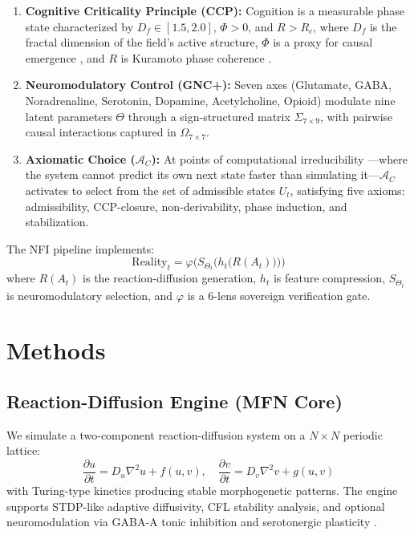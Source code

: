 \documentclass[10pt,letterpaper]{article}
\begin{document}
\begin{enumerate}
  \item \textbf{Cognitive Criticality Principle (CCP):} Cognition is a
    measurable phase state characterized by $D_f \in [1.5, 2.0]$,
    $\Phi > 0$, and $R > R_c$, where $D_f$ is the fractal dimension
    of the field's active structure, $\Phi$ is a proxy for causal
    emergence \citep{hoel2013}, and $R$ is Kuramoto phase
    coherence \citep{kuramoto1984}.

  \item \textbf{Neuromodulatory Control (GNC+):} Seven axes
    (Glutamate, GABA, Noradrenaline, Serotonin, Dopamine,
    Acetylcholine, Opioid) modulate nine latent parameters $\Theta$
    through a sign-structured matrix $\Sigma_{7 \times 9}$, with
    pairwise causal interactions captured in $\Omega_{7 \times 7}$.

  \item \textbf{Axiomatic Choice ($\mathcal{A}_C$):} At points of
    computational irreducibility \citep{wolfram2002}---where the
    system cannot predict its own next state faster than simulating
    it---$\mathcal{A}_C$ activates to select from the set of
    admissible states $U_t$, satisfying five axioms: admissibility,
    CCP-closure, non-derivability, phase induction, and stabilization.
\end{enumerate}

The NFI pipeline implements:
$$
  \text{Reality}_t = \varphi\bigl(
    S_{\Theta_t}\bigl( h_t\bigl( R(A_t) \bigr) \bigr)
  \bigr)
$$
where $R(A_t)$ is the reaction-diffusion generation,
$h_t$ is feature compression, $S_{\Theta_t}$ is neuromodulatory
selection, and $\varphi$ is a 6-lens sovereign verification gate.

\section{Methods}

\subsection{Reaction-Diffusion Engine (MFN Core)}

We simulate a two-component reaction-diffusion system on a
$N \times N$ periodic lattice:
\begin{equation}
  \frac{\partial u}{\partial t} = D_u \nabla^2 u + f(u, v), \quad
  \frac{\partial v}{\partial t} = D_v \nabla^2 v + g(u, v)
  \label{eq:rd}
\end{equation}
with Turing-type kinetics producing stable morphogenetic patterns.
The engine supports STDP-like adaptive diffusivity, CFL stability
analysis, and optional neuromodulation via GABA-A tonic inhibition
and serotonergic plasticity \citep{tero2010}.
\end{document}
